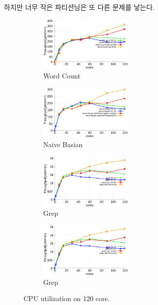 \ifkor
하지만 너무 작은 파티션닝은 또 다른 문제를 낳는다. 
\else

\fi


\begin{figure}[tb]
    \centering
    \begin{subfigure}[b]{0.25\textwidth}
        \includegraphics[width=1.8in]{graph/wc_docker.eps}
        \caption{Word Count}
    \end{subfigure}%
    \begin{subfigure}[b]{0.25\textwidth}
        \includegraphics[width=1.8in]{graph/nb_docker.eps}
        \caption{Naive Basian}
    \end{subfigure}%
    \begin{subfigure}[b]{0.25\textwidth}
        \includegraphics[width=1.8in]{graph/grep_docker.eps}
        \caption{Grep}
    \end{subfigure}%
    \begin{subfigure}[b]{0.25\textwidth}
        \includegraphics[width=1.8in]{graph/grep_docker.eps}
        \caption{Grep}
    \end{subfigure}%
    \caption{CPU utilization on 120 core.}
    \label{fig:utilization}
\end{figure}



